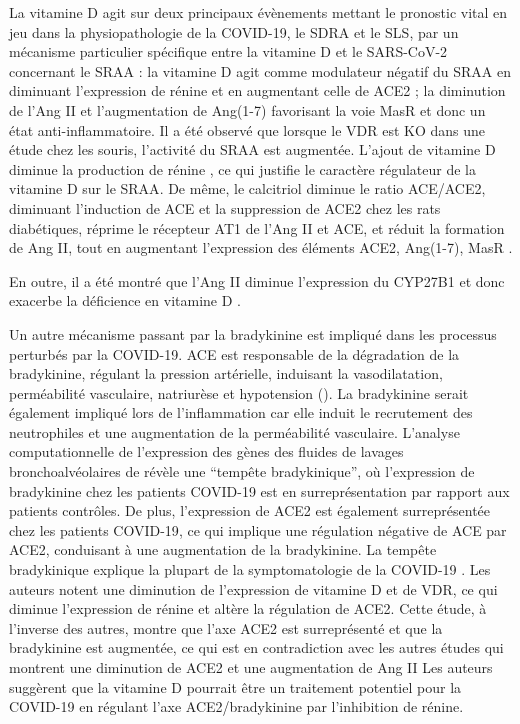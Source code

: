 \documentclass[
  a4paper,
  DIV=11,
  numbers=noendperiod,
  listof=totoc]{scrreprt}
\begin{document}
La vitamine D agit sur deux principaux évènements mettant le pronostic
vital en jeu dans la physiopathologie de la \ac{COVID-19}, le \ac{SDRA}
et le \ac{SLS}, par un mécanisme particulier spécifique entre la
vitamine D et le \ac{SARS-CoV-2} \autocite{Borsche.2021} concernant le
\ac{SRAA} : la vitamine D agit comme modulateur négatif du \ac{SRAA} en
diminuant l'expression de rénine et en augmentant celle de \ac{ACE2} ;
la diminution de l'\ac{Ang II} et l'augmentation de \ac{Ang(1-7)}
favorisant la voie \ac{MasR} et donc un état anti-inflammatoire. Il a
été observé que lorsque le \ac{VDR} est KO dans une étude chez les
souris, l'activité du \ac{SRAA} est augmentée. L'ajout de vitamine D
diminue la production de rénine \autocite{Li.2002}, ce qui justifie le
caractère régulateur de la vitamine D sur le \ac{SRAA}. De même, le
calcitriol diminue le ratio \ac{ACE}/\ac{ACE2}, diminuant l'induction de
\ac{ACE} et la suppression de \ac{ACE2} chez les rats diabétiques,
réprime le récepteur AT1 de l'\ac{Ang II} et \ac{ACE}, et réduit la
formation de \ac{Ang II}, tout en augmentant l'expression des éléments
\ac{ACE2}, \ac{Ang(1-7)}, \ac{MasR} \autocite{Mahdavi.2020}.

En outre, il a été montré que l'\ac{Ang II} diminue l'expression du
\ac{CYP27B1} et donc exacerbe la déficience en vitamine D
\autocite{Borst.2011}.

Un autre mécanisme passant par la bradykinine est impliqué dans les
processus perturbés par la \ac{COVID-19}. \ac{ACE} est responsable de la
dégradation de la bradykinine, régulant la pression artérielle,
induisant la vasodilatation, perméabilité vasculaire, natriurèse et
hypotension (). La bradykinine serait également
impliqué lors de l'inflammation car elle induit le recrutement des
neutrophiles et une augmentation de la perméabilité vasculaire.
L'analyse computationnelle de l'expression des gènes des fluides de
lavages bronchoalvéolaires de \textcite{Garvin.2020} révèle une
``tempête bradykinique'', où l'expression de bradykinine chez les
patients \ac{COVID-19} est en surreprésentation par rapport aux patients
contrôles. De plus, l'expression de \ac{ACE2} est également
surreprésentée chez les patients \ac{COVID-19}, ce qui implique une
régulation négative de \ac{ACE} par \ac{ACE2}, conduisant à une
augmentation de la bradykinine. La tempête bradykinique explique la
plupart de la symptomatologie de la \ac{COVID-19}
\autocite{Garvin.2020}. Les auteurs notent une diminution de
l'expression de vitamine D et de VDR, ce qui diminue l'expression de
rénine et altère la régulation de ACE2. Cette étude, à l'inverse des
autres, montre que l'axe \ac{ACE2} est surreprésenté et que la
bradykinine est augmentée, ce qui est en contradiction avec les autres
études qui montrent une diminution de \ac{ACE2} et une augmentation de
Ang II Les auteurs suggèrent que la vitamine D pourrait être un
traitement potentiel pour la \ac{COVID-19} en régulant l'axe
\ac{ACE2}/bradykinine par l'inhibition de rénine.
\end{document}
